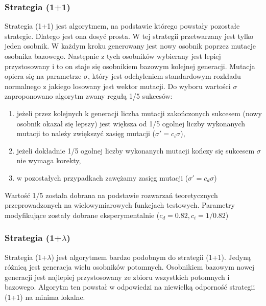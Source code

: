 \documentclass[12pt,a4paper]{article}
\begin{document}
\subsubsection{Strategia (1+1)}
\indent Strategia (1+1) jest algorytmem, na podstawie którego powstały pozostałe strategie. Dlatego jest ona dosyć prosta. W tej strategii przetwarzany jest tylko jeden osobnik. W każdym kroku generowany jest nowy osobnik poprzez mutacje osobnika bazowego. Następnie z tych osobników wybierany jest lepiej przystosowany i to on staje się osobnikiem bazowym kolejnej generacji. Mutacja opiera się na parametrze $\sigma$, który jest odchyleniem standardowym rozkładu normalnego z jakiego losowany jest wektor mutacji.
\indent Do wyboru wartości $\sigma$ zaproponowano algorytm zwany regułą 1/5 sukcesów: \begin{enumerate}
\item jeżeli przez kolejnych k generacji liczba mutacji zakończonych sukcesem (nowy osobnik okazał się lepszy) jest większa od 1/5 ogolnej liczby wykonanych mutacji to należy zwiększyć zasięg mutacji ($\sigma' = c_i\sigma$),
\item jeżeli dokładnie 1/5 ogolnej liczby wykonanych mutacji kończy się sukcesem $\sigma$ nie wymaga korekty,
\item w pozostałych przypadkach zawężamy zasięg mutacji ($\sigma' = c_d\sigma$)
\end{enumerate}
Wartość 1/5 została dobrana na podstawie rozwarzań teoretycznych przeprowadzonych na wielowymiarowych funkcjach testowych. Parametry modyfikujące zostały dobrane eksperymentalnie ($c_d = 0.82, c_i = 1/0.82$)
\subsubsection{Strategia (1+$\lambda$)}
\indent Strategia (1+$\lambda$) jest algorytmem bardzo podobnym do strategii (1+1). Jedyną różnicą jest generacja wielu osobników potomnych. Osobnikiem bazowym nowej generacji jest najlepiej przystosowany ze zbioru wszystkich potomnych i bazowego. Algorytm ten powstał w odpowiedzi na niewielką odporność strategii (1+1) na minima lokalne.
\end{document}
